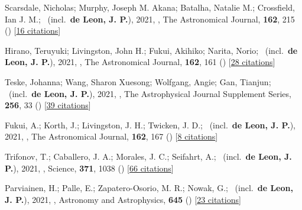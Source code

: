 \item[{\color{numcolor}\scriptsize38}] Scarsdale, Nicholas; Murphy, Joseph M. Akana; Batalha, Natalie M.; Crossfield, Ian J. M.; \etal\ (incl.\ \textbf{de Leon, J. P.}), 2021, , The Astronomical Journal, \textbf{162}, 215 () [\href{https://ui.adsabs.harvard.edu/abs/2021AJ....162..215S}{16 citations}]

\item[{\color{numcolor}\scriptsize37}] Hirano, Teruyuki; Livingston, John H.; Fukui, Akihiko; Narita, Norio; \etal\ (incl.\ \textbf{de Leon, J. P.}), 2021, , The Astronomical Journal, \textbf{162}, 161 () [\href{https://ui.adsabs.harvard.edu/abs/2021AJ....162..161H}{28 citations}]

\item[{\color{numcolor}\scriptsize36}] Teske, Johanna; Wang, Sharon Xuesong; Wolfgang, Angie; Gan, Tianjun; \etal\ (incl.\ \textbf{de Leon, J. P.}), 2021, , The Astrophysical Journal Supplement Series, \textbf{256}, 33 () [\href{https://ui.adsabs.harvard.edu/abs/2021ApJS..256...33T}{39 citations}]

\item[{\color{numcolor}\scriptsize35}] Fukui, A.; Korth, J.; Livingston, J. H.; Twicken, J. D.; \etal\ (incl.\ \textbf{de Leon, J. P.}), 2021, , The Astronomical Journal, \textbf{162}, 167 () [\href{https://ui.adsabs.harvard.edu/abs/2021AJ....162..167F}{8 citations}]

\item[{\color{numcolor}\scriptsize34}] Trifonov, T.; Caballero, J. A.; Morales, J. C.; Seifahrt, A.; \etal\ (incl.\ \textbf{de Leon, J. P.}), 2021, , Science, \textbf{371}, 1038 () [\href{https://ui.adsabs.harvard.edu/abs/2021Sci...371.1038T}{66 citations}]

\item[{\color{numcolor}\scriptsize33}] Parviainen, H.; Palle, E.; Zapatero-Osorio, M. R.; Nowak, G.; \etal\ (incl.\ \textbf{de Leon, J. P.}), 2021, , Astronomy and Astrophysics, \textbf{645} () [\href{https://ui.adsabs.harvard.edu/abs/2021A&A...645A..16P}{23 citations}]

